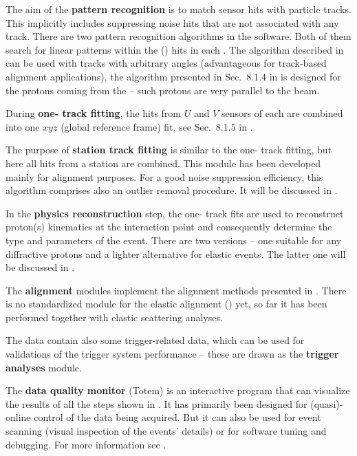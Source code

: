 \> The aim of the {\bf pattern recognition} is to match sensor hits with particle tracks. This implicitly includes suppressing noise hits that are not associated with any track. There are two pattern recognition algorithms in the  software. Both of them search for linear patterns within the () hits in each . The algorithm described in  can be used with tracks with arbitrary angles (advantageous for track-based alignment applications), the algorithm presented in Sec.~8.1.4 in  is designed for the protons coming from the  -- such protons are very parallel to the beam.

\> During {\bf one- track fitting}, the hits from $U$ and $V$ sensors of each  are combined into one $xyz$ (global reference frame) fit, see Sec.~8.1.5 in .

\> The purpose of {\bf station track fitting} is similar to the one- track fitting, but here all hits from a station are combined. This module has been developed mainly for alignment purposes. For a good noise suppression efficiency, this algorithm comprises also an outlier removal procedure. It will be discussed in .

\> In the {\bf physics reconstruction} step, the one- track fits are used to reconstruct proton(s) kinematics at the interaction point and consequently determine the type and parameters of the event. There are two versions -- one suitable for any diffractive protons and a lighter alternative for elastic events. The latter one will be discussed in .

\> The {\bf alignment} modules implement the  alignment methods presented in . There is no standardized module for the elastic alignment () yet, so far it has been performed together with elastic scattering analyses.

\> The  data contain also some trigger-related data, which can be used for validations of the trigger system performance -- these are drawn as the {\bf trigger analyses} module.

\> The {\bf data quality monitor} (Totem) is an interactive program that can visualize the results of all the steps shown in . It has primarily been designed for (quasi)-online control of the data being acquired. But it can also be used for event scanning (visual inspection of the events' details) or for software tuning and debugging. For more information see .



